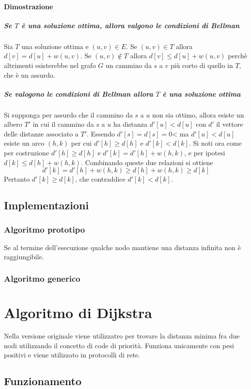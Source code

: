 \paragraph{Dimostrazione}
\subparagraph{Se $T$ \`e una soluzione ottima, allora valgono le condizioni di Bellman} Sia $T$ una soluzione ottima e $(u, v)\in E$. Se $(u, v)\in T$ allora $d[v]=d[u]+w(u, v)$. Se
$(u, v)\not\in T$ allora $d[v]\le d[u]+w(u, v)$ perch\`e altrimenti esisterebbe nel grafo $G$ un cammino da $s$ a $v$ pi\`u corto di quello in $T$, che \`e un assurdo.
\subparagraph{Se valogono le condizioni di Bellman allora $T$ \`e una soluzione ottima} Si supponga per assurdo che il cammino da $s$ a $u$ non sia ottimo, allora esiste un albero $T'$
in cui il cammino da $s$ a $u$ ha distanza $d'[u]<d[u]$ con $d'$ il vettore delle distanze associato a $T'$. Essendo $d'[s]=d[s]=0$< ma $d'[u]<d[u]$ esiste un arco $(h, k)$ per cui 
$d'[h]\ge d[h]$ e $d'[k]<d[k]$. Si noti ora come per costruzione $d'[h]\ge d[h]$ e $d'[k]=d'[h]+w(h, k)$, e per ipotesi $d[k]\le d[h]+w(h, k)$. Combinando queste due relazioni si ottiene
$$ d'[k] = d'[h]+w(h, k)\ge d[h]+w(h, k)\ge d[k]$$ Pertanto $d'[k]\ge d[k]$, che contraddice $d'[k]<d[k]$. 
\subsection{Implementazioni}
\subsubsection{Algoritmo prototipo}

Se al termine dell'esecuzione qualche nodo mantiene una distanza infinita non \`e raggiungibile.
\subsubsection{Algoritmo generico}



\section{Algoritmo di Dijkstra}
Nella versione originale viene utilizzatro per trovare la distanza minima fra due nodi utilizzando il concetto di code di priorit\`a. Funziona unicamente con pesi positivi e viene 
utilizzato in protocolli di rete.
\subsection{Funzionamento}
